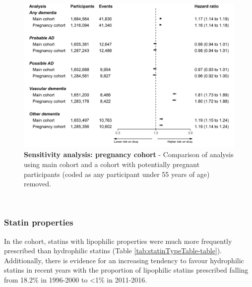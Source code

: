 \documentclass[a4paper, twoside]{templates/ociamthesis}
\begin{document}
\begin{figure}[H]
\includegraphics[width=1\linewidth]{figures/cprd-analysis/forester_pregnancy} \caption[Sensitivity analysis: pregnancy cohort]{\textbf{Sensitivity analysis: pregnancy cohort} - Comparison of analysis using main cohort and a cohort with potentially pregnant participants (coded as any participant under 55 years of age) removed.}\label{fig:pregnancyFig}
\end{figure}

~

\hypertarget{statin-properties-1}{%
\subsubsection{Statin properties}\label{statin-properties-1}}

In the cohort, statins with lipophilic properties were much more frequently prescribed than hydrophilic statins (Table \ref{tab:statinTypeTable-table}). Additionally, there is evidence for an increasing tendency to favour hydrophilic statins in recent years with the proportion of lipophilic statins prescribed falling from 18.2\% in 1996-2000 to \textless1\% in 2011-2016.

~
\end{document}
